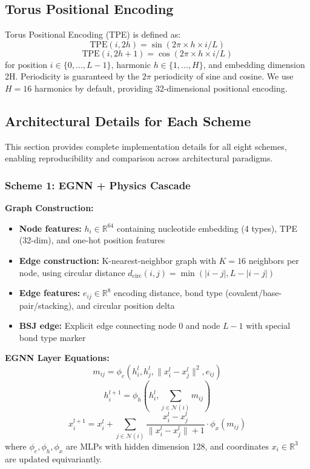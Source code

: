 \documentclass[12pt]{article}
\begin{document}
\subsection{Torus Positional Encoding}

Torus Positional Encoding (TPE) is defined as:
\begin{equation}
\text{TPE}(i, 2h) = \sin(2\pi \times h \times i / L)
\end{equation}
\begin{equation}
\text{TPE}(i, 2h+1) = \cos(2\pi \times h \times i / L)
\end{equation}
for position $i \in \{0, ..., L-1\}$, harmonic $h \in \{1, ..., H\}$, and embedding dimension 2H. Periodicity is guaranteed by the $2\pi$ periodicity of sine and cosine. We use $H = 16$ harmonics by default, providing 32-dimensional positional encoding.

\subsection{Architectural Details for Each Scheme}

This section provides complete implementation details for all eight schemes, enabling reproducibility and comparison across architectural paradigms.

\subsubsection{Scheme 1: EGNN + Physics Cascade}

\textbf{Graph Construction:}
\begin{itemize}
\item \textbf{Node features:} $h_i \in \mathbb{R}^{64}$ containing nucleotide embedding (4 types), TPE (32-dim), and one-hot position features
\item \textbf{Edge construction:} K-nearest-neighbor graph with $K=16$ neighbors per node, using circular distance $d_{\text{circ}}(i,j) = \min(|i-j|, L-|i-j|)$
\item \textbf{Edge features:} $e_{ij} \in \mathbb{R}^{8}$ encoding distance, bond type (covalent/base-pair/stacking), and circular position delta
\item \textbf{BSJ edge:} Explicit edge connecting node 0 and node $L-1$ with special bond type marker
\end{itemize}

\textbf{EGNN Layer Equations:}
\begin{equation}
m_{ij} = \phi_e(h_i^l, h_j^l, \|x_i^l - x_j^l\|^2, e_{ij})
\end{equation}
\begin{equation}
h_i^{l+1} = \phi_h(h_i^l, \sum_{j \in \mathcal{N}(i)} m_{ij})
\end{equation}
\begin{equation}
x_i^{l+1} = x_i^l + \sum_{j \in \mathcal{N}(i)} \frac{x_i^l - x_j^l}{\|x_i^l - x_j^l\| + 1} \cdot \phi_x(m_{ij})
\end{equation}
where $\phi_e, \phi_h, \phi_x$ are MLPs with hidden dimension 128, and coordinates $x_i \in \mathbb{R}^3$ are updated equivariantly.
\end{document}
